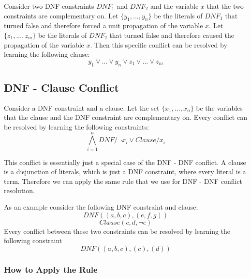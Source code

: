 \begin{leftbar}
Consider two DNF constraints $DNF_1$ and $DNF_2$ and the variable $x$ that the two constraints are complementary on. Let $\{y_1,...,y_n\}$ be the literals of $DNF_1$ that turned false and therefore forced a unit propagation of the variable $x$. Let $\{z_1,...,z_m\}$ be the literals of $DNF_2$ that turned false and therefore caused the propagation of the variable $x$. Then this specific conflict can be resolved by learning the following clause:
\begin{displaymath}
y_1 \vee ... \vee y_n \vee z_1 \vee ... \vee z_m
\end{displaymath}
\end{leftbar}

\subsection{DNF - Clause Conflict}
\begin{leftbar}
Consider a DNF constraint and a clause. Let the set $\{x_1,...,x_n\}$ be the variables that the clause and the DNF constraint are complementary on. Every conflict can be resolved by learning the following constraints:
\begin{displaymath}
\bigwedge_{i=1}^{n} DNF / \neg x_i \vee Clause / x_i
\end{displaymath}
\end{leftbar}
This conflict is essentially just a special case of the DNF - DNF conflict. A clause is a disjunction of literals, which is just a DNF constraint, where every literal is a term. Therefore we can apply the same rule that we use for DNF - DNF conflict resolution.

As an example consider the following DNF constraint and clause:
\begin{displaymath}
DNF((a,b,c),(e,f,g))
\end{displaymath}
\begin{displaymath}
Clause(c,d,\neg e)
\end{displaymath}
Every conflict between these two constraints can be resolved by learning the following constraint
\begin{displaymath}
DNF((a,b,c),(c),(d))
\end{displaymath}

\subsubsection{How to Apply the Rule}

